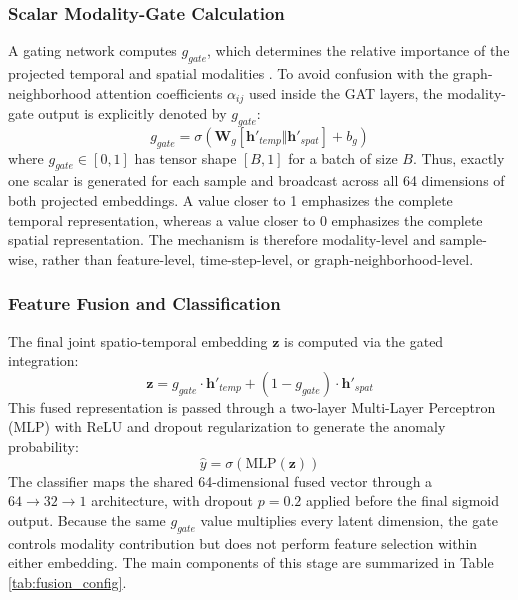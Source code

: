 \documentclass[journal]{IEEEtran}
\begin{document}
\subsubsection{Scalar Modality-Gate Calculation}
A gating network computes $g_{gate}$, which determines the relative importance of the projected temporal and spatial modalities \cite{zhang_context-aware_2025}. To avoid confusion with the graph-neighborhood attention coefficients $\alpha_{ij}$ used inside the GAT layers, the modality-gate output is explicitly denoted by $g_{gate}$:
\begin{equation}
  g_{gate} = \sigma(\mathbf{W}_g [\mathbf{h}'_{temp} \Vert \mathbf{h}'_{spat}] + b_g)
\end{equation}
where $g_{gate}\in[0,1]$ has tensor shape $[B,1]$ for a batch of size $B$. Thus, exactly one scalar is generated for each sample and broadcast across all 64 dimensions of both projected embeddings. A value closer to 1 emphasizes the complete temporal representation, whereas a value closer to 0 emphasizes the complete spatial representation. The mechanism is therefore modality-level and sample-wise, rather than feature-level, time-step-level, or graph-neighborhood-level.

\subsubsection{Feature Fusion and Classification}
The final joint spatio-temporal embedding $\mathbf{z}$ is computed via the gated integration:
\begin{equation}
  \mathbf{z} = g_{gate} \cdot \mathbf{h}'_{temp} + (1 - g_{gate}) \cdot \mathbf{h}'_{spat}
\end{equation}
This fused representation is passed through a two-layer Multi-Layer Perceptron (MLP) with ReLU and dropout regularization to generate the anomaly probability:
\begin{equation}
  \hat{y} = \sigma(\text{MLP}(\mathbf{z}))
\end{equation}
The classifier maps the shared 64-dimensional fused vector through a $64 \rightarrow 32 \rightarrow 1$ architecture, with dropout $p = 0.2$ applied before the final sigmoid output. Because the same $g_{gate}$ value multiplies every latent dimension, the gate controls modality contribution but does not perform feature selection within either embedding. The main components of this stage are summarized in Table \ref{tab:fusion_config}.
\end{document}
